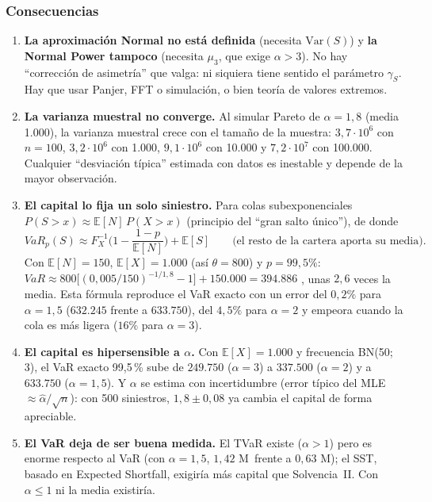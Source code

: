 \documentclass[a4paper,12pt]{article}
\newcommand{\euro}{\texteuro}
\newcommand{\E}{\mathbb{E}}
\newcommand{\Var}{\mathrm{Var}}
\begin{document}
\subsubsection*{Consecuencias}
\begin{enumerate}[leftmargin=*]
\item \textbf{La aproximaci\'on Normal no est\'a definida} (necesita $\Var(S)$) y \textbf{la Normal Power tampoco} (necesita $\mu_3$, que exige $\alpha>3$). No hay ``correcci\'on de asimetr\'ia'' que valga: ni siquiera tiene sentido el par\'ametro $\gamma_S$. Hay que usar Panjer, FFT o simulaci\'on, o bien teor\'ia de valores extremos.
\item \textbf{La varianza muestral no converge.} Al simular Pareto de $\alpha=1{,}8$ (media 1.000), la varianza muestral crece con el tama\~no de la muestra: $3{,}7\cdot10^6$ con $n=100$, $3{,}2\cdot10^6$ con 1.000, $9{,}1\cdot10^6$ con 10.000 y $7{,}2\cdot10^7$ con 100.000. Cualquier ``desviaci\'on t\'ipica'' estimada con datos es inestable y depende de la mayor observaci\'on.
\item \textbf{El capital lo fija un solo siniestro.} Para colas subexponenciales $P(S>x)\approx\E[N]\,P(X>x)$ (principio del ``gran salto \'unico''), de donde
\[
VaR_p(S)\approx F_X^{-1}\!\Big(1-\frac{1-p}{\E[N]}\Big)+\E[S]\qquad\text{(el resto de la cartera aporta su media).}
\]
Con $\E[N]=150$, $\E[X]=1.000$ (as\'i $\theta=800$) y $p=99{,}5\%$: $VaR\approx800\big[(0{,}005/150)^{-1/1{,}8}-1\big]+150.000=394.886$ \euro, unas $2{,}6$ veces la media. Esta f\'ormula reproduce el VaR exacto con un error del $0{,}2\%$ para $\alpha=1{,}5$ ($632.245$ frente a $633.750$), del $4{,}5\%$ para $\alpha=2$ y empeora cuando la cola es m\'as ligera ($16\%$ para $\alpha=3$).
\item \textbf{El capital es hipersensible a $\alpha$.} Con $\E[X]=1.000$ y frecuencia BN(50; 3), el VaR exacto 99,5\,\% sube de $249.750$ ($\alpha=3$) a $337.500$ ($\alpha=2$) y a $633.750$ ($\alpha=1{,}5$). Y $\alpha$ se estima con incertidumbre (error t\'ipico del MLE $\approx\hat\alpha/\sqrt n$): con 500 siniestros, $1{,}8\pm0{,}08$ ya cambia el capital de forma apreciable.
\item \textbf{El VaR deja de ser buena medida.} El TVaR existe ($\alpha>1$) pero es enorme respecto al VaR (con $\alpha=1{,}5$, $1{,}42$ M\euro\ frente a $0{,}63$ M\euro); el SST, basado en Expected Shortfall, exigir\'ia m\'as capital que Solvencia~II. Con $\alpha\le1$ ni la media existir\'ia.
\end{enumerate}
\end{document}
